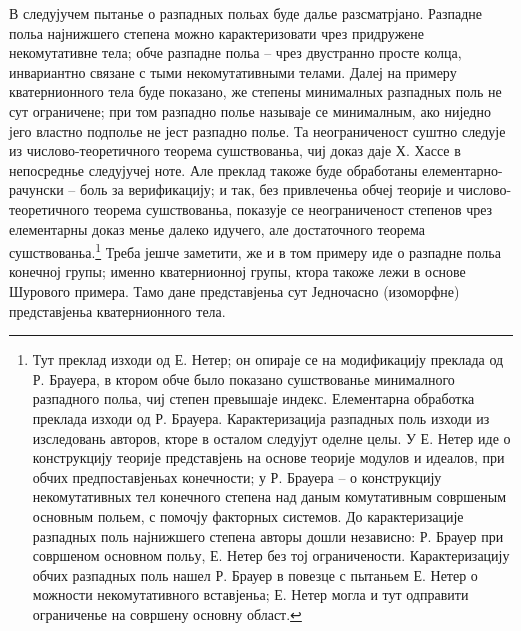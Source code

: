 \documentclass[11pt]{article}
\begin{document}
\setcounter{footnote}{0}

\noindent В следујучем пытанье о разпадных польах буде далье разсматрјано. Разпадне польа најнижшего степена можно карактеризовати чрез придружене некомутативне тела; обче разпадне польа -- чрез двустранно просте колца, инвариантно связане с тыми некомутативными телами. Далеј на примеру кватернионного тела буде показано, же степены минималных разпадных поль не сут ограничене; при том разпадно полье называје се минималным, ако ниједно јего властно подполье не јест разпадно полье. Та неограниченост суштно следује из числово-теоретичного теорема сушствованьа, чиј доказ даје Х. Хассе в непосреднье следујучеј ноте. Але преклад такоже буде обработаны елементарно-рачунски -- боль за верификацију; и так, без привлеченьа обчеј теорије и числово-теоретичного теорема сушствованьа, показује се неограниченост степенов чрез елементарны доказ менье далеко идучего, але достаточного теорема сушствованьа.\footnote{Тут преклад изходи од Е. Нетер; он опираје се на модификацију преклада од Р. Брауера, в ктором обче было показано сушствованье минималного разпадного польа, чиј степен превышаје индекс. Елементарна обработка преклада изходи од Р. Брауера. Карактеризација разпадных поль изходи из изследовань авторов, кторе в осталом следујут оделне целы. У Е. Нетер иде о конструкцију теорије представјень на основе теорије модулов и идеалов, при обчих предпоставјеньах конечности; у Р. Брауера -- о конструкцију некомутативных тел конечного степена над даным комутативным совршеным основным польем, с помочју факторных системов. До карактеризације разпадных поль најнижшего степена авторы дошли независно: Р. Брауер при совршеном основном польу, Е. Нетер без тој ограничености. Карактеризацију обчих разпадных поль нашел Р. Брауер в повезце с пытаньем Е. Нетер о можности некомутативного вставјеньа; Е. Нетер могла и тут одправити ограниченье на совршену основну област.} Треба јешче заметити, же и в том примеру иде о разпадне польа конечној групы; именно кватернионној групы, ктора такоже лежи в основе Шурового примера. Тамо дане представјеньа сут Једночасно (изоморфне) представјеньа кватернионного тела.
\end{document}
